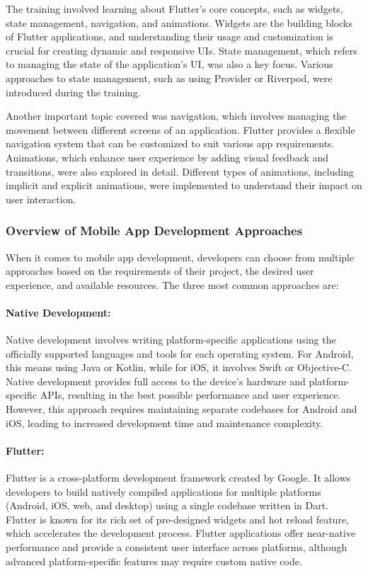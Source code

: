 \documentclass[12pt,a4paper]{report}
\begin{document}
The training involved learning about Flutter's core concepts, such as widgets, state management, navigation, and animations. Widgets are the building blocks of Flutter applications, and understanding their usage and customization is crucial for creating dynamic and responsive UIs. State management, which refers to managing the state of the application’s UI, was also a key focus. Various approaches to state management, such as using Provider or Riverpod, were introduced during the training.

Another important topic covered was navigation, which involves managing the movement between different screens of an application. Flutter provides a flexible navigation system that can be customized to suit various app requirements. Animations, which enhance user experience by adding visual feedback and transitions, were also explored in detail. Different types of animations, including implicit and explicit animations, were implemented to understand their impact on user interaction.

\subsubsection{Overview of Mobile App Development Approaches}

When it comes to mobile app development, developers can choose from multiple approaches based on the requirements of their project, the desired user experience, and available resources. The three most common approaches are:

\paragraph{Native Development:}
Native development involves writing platform-specific applications using the officially supported languages and tools for each operating system. For Android, this means using Java or Kotlin, while for iOS, it involves Swift or Objective-C. Native development provides full access to the device’s hardware and platform-specific APIs, resulting in the best possible performance and user experience. However, this approach requires maintaining separate codebases for Android and iOS, leading to increased development time and maintenance complexity.

\paragraph{Flutter:}
Flutter is a cross-platform development framework created by Google. It allows developers to build natively compiled applications for multiple platforms (Android, iOS, web, and desktop) using a single codebase written in Dart. Flutter is known for its rich set of pre-designed widgets and hot reload feature, which accelerates the development process. Flutter applications offer near-native performance and provide a consistent user interface across platforms, although advanced platform-specific features may require custom native code.
\end{document}
